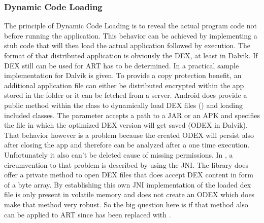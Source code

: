 \subsubsection{Dynamic Code Loading}\label{section:dynamic_code_loading}
The principle of Dynamic Code Loading is to reveal the actual program code
not before running the application. This behavior can be achieved by
implementing a stub code that will then load the actual application
followed by execution. The format of that distributed application is
obviously the DEX, at least in Dalvik. If DEX still can be used
for ART has to be determined. In \parencite{dexfileclass} a practical
sample implementation for Dalvik is given.
To provide a copy protection benefit, an additional application file can either be distributed encrypted within the app stored in the  folder or it can be fetched from a server.
Android does provide a public method within
the  class to dynamically load DEX files
()
and loading included classes. The  parameter accepts
a path to a JAR or an APK and  specifies
the file in which the optimized DEX version will get saved (ODEX in Dalvik).
That behavior however is a problem because the created ODEX will persist
also after closing the app and therefore can be analyzed after a one time
execution. Unfortunately it also can't be deleted cause of missing permissions.
In \parencite{code_protection},
a circumvention to that problem is described by using the JNI.
The  library does offer a private method to open DEX files
that does accept DEX content in form of a byte array.
By establishing this own JNI implementation of
 the loaded dex file is only present
in volatile memory and does not create an ODEX \parencite{code_protection}
which does make that method very robust. So the big question here is if
that method also can be applied to ART since  has been replaced
with .

